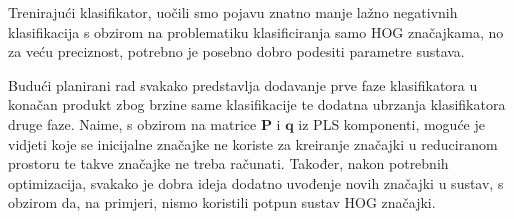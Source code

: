 \documentclass[seminar]{fer}
\begin{document}
Trenirajući klasifikator, uočili smo pojavu znatno manje lažno negativnih klasifikacija s obzirom na problematiku klasificiranja samo HOG značajkama, no za veću preciznost, potrebno je posebno dobro podesiti parametre sustava.

Budući planirani rad svakako predstavlja dodavanje prve faze klasifikatora u konačan produkt zbog brzine same klasifikacije te dodatna ubrzanja klasifikatora druge faze. Naime, s obzirom na matrice $\mathbf{P}$ i $\mathbf{q}$ iz PLS komponenti, moguće je vidjeti koje se inicijalne značajke ne koriste za kreiranje  značajki u reduciranom prostoru te takve značajke ne treba računati. Također, nakon potrebnih optimizacija, svakako je dobra ideja dodatno uvođenje novih značajki u sustav, s obzirom da, na primjeri, nismo koristili potpun sustav HOG značajki.




\end{document}
